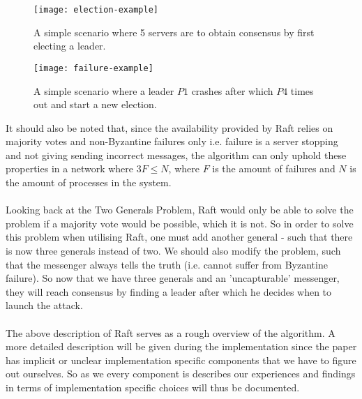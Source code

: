 \begin{figure}[ht]
\centering
\texttt{[image: election-example]}
\caption{A simple scenario where 5 servers are to obtain consensus by first electing a leader.}
\label{fig:election_example}
\end{figure}

\begin{figure}[ht]
\centering
\texttt{[image: failure-example]}
\caption{A simple scenario where a leader $P1$ crashes after which $P4$ times out and start a new election.}
\label{fig:failure_example}
\end{figure}

It should also be noted that, since the availability provided by Raft relies on majority votes and non-Byzantine failures only i.e. failure is a server stopping and not giving sending incorrect messages, the algorithm can only uphold these properties in a network where $3F \leq N$, where $F$ is the amount of failures and $N$ is the amount of processes in the system.
\\ \\
Looking back at the Two Generals Problem, Raft would only be able to solve the problem if a majority vote would be possible, which it is not. So in order to solve this problem when utilising Raft, one must add another general - such that there is now three generals instead of two. We should also modify the problem, such that the messenger always tells the truth (i.e. cannot suffer from Byzantine failure). So now that we have three generals and an 'uncapturable' messenger, they will reach consensus by finding a leader after which he decides when to launch the attack.
\\ \\
The above description of Raft serves as a rough overview of the algorithm. A more detailed description will be given during the implementation since the paper has implicit or unclear implementation specific components that we have to figure out ourselves. So as we every component is describes our experiences and findings in terms of implementation specific choices will thus be documented.
